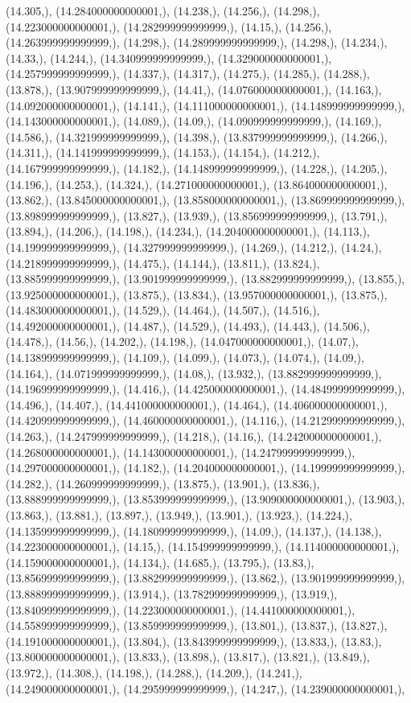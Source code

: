 \documentclass{article}
\begin{document}
(14.305,), (14.284000000000001,), (14.238,), (14.256,), (14.298,), (14.223000000000001,), (14.282999999999999,), (14.15,), (14.256,), (14.263999999999999,), (14.298,), (14.289999999999999,), (14.298,), (14.234,), (14.33,), (14.244,), (14.340999999999999,), (14.329000000000001,), (14.257999999999999,), (14.337,), (14.317,), (14.275,), (14.285,), (14.288,), (13.878,), (13.907999999999999,), (14.41,), (14.076000000000001,), (14.163,), (14.092000000000001,), (14.141,), (14.111000000000001,), (14.148999999999999,), (14.143000000000001,), (14.089,), (14.09,), (14.090999999999999,), (14.169,), (14.586,), (14.321999999999999,), (14.398,), (13.837999999999999,), (14.266,), (14.311,), (14.141999999999999,), (14.153,), (14.154,), (14.212,), (14.167999999999999,), (14.182,), (14.148999999999999,), (14.228,), (14.205,), (14.196,), (14.253,), (14.324,), (14.271000000000001,), (13.864000000000001,), (13.862,), (13.845000000000001,), (13.858000000000001,), (13.869999999999999,), (13.898999999999999,), (13.827,), (13.939,), (13.856999999999999,), (13.791,), (13.894,), (14.206,), (14.198,), (14.234,), (14.204000000000001,), (14.113,), (14.199999999999999,), (14.327999999999999,), (14.269,), (14.212,), (14.24,), (14.218999999999999,), (14.475,), (14.144,), (13.811,), (13.824,), (13.885999999999999,), (13.901999999999999,), (13.882999999999999,), (13.855,), (13.925000000000001,), (13.875,), (13.834,), (13.957000000000001,), (13.875,), (14.483000000000001,), (14.529,), (14.464,), (14.507,), (14.516,), (14.492000000000001,), (14.487,), (14.529,), (14.493,), (14.443,), (14.506,), (14.478,), (14.56,), (14.202,), (14.198,), (14.047000000000001,), (14.07,), (14.138999999999999,), (14.109,), (14.099,), (14.073,), (14.074,), (14.09,), (14.164,), (14.071999999999999,), (14.08,), (13.932,), (13.882999999999999,), (14.196999999999999,), (14.416,), (14.425000000000001,), (14.484999999999999,), (14.496,), (14.407,), (14.441000000000001,), (14.464,), (14.406000000000001,), (14.420999999999999,), (14.460000000000001,), (14.116,), (14.212999999999999,), (14.263,), (14.247999999999999,), (14.218,), (14.16,), (14.242000000000001,), (14.268000000000001,), (14.143000000000001,), (14.247999999999999,), (14.297000000000001,), (14.182,), (14.204000000000001,), (14.199999999999999,), (14.282,), (14.260999999999999,), (13.875,), (13.901,), (13.836,), (13.888999999999999,), (13.853999999999999,), (13.909000000000001,), (13.903,), (13.863,), (13.881,), (13.897,), (13.949,), (13.901,), (13.923,), (14.224,), (14.135999999999999,), (14.180999999999999,), (14.09,), (14.137,), (14.138,), (14.223000000000001,), (14.15,), (14.154999999999999,), (14.114000000000001,), (14.159000000000001,), (14.134,), (14.685,), (13.795,), (13.83,), (13.856999999999999,), (13.882999999999999,), (13.862,), (13.901999999999999,), (13.888999999999999,), (13.914,), (13.782999999999999,), (13.919,), (13.840999999999999,), (14.223000000000001,), (14.441000000000001,), (14.558999999999999,), (13.859999999999999,), (13.801,), (13.837,), (13.827,), (14.191000000000001,), (13.804,), (13.843999999999999,), (13.833,), (13.83,), (13.800000000000001,), (13.833,), (13.898,), (13.817,), (13.821,), (13.849,), (13.972,), (14.308,), (14.198,), (14.288,), (14.209,), (14.241,), (14.249000000000001,), (14.295999999999999,), (14.247,), (14.239000000000001,), 
\end{document}
